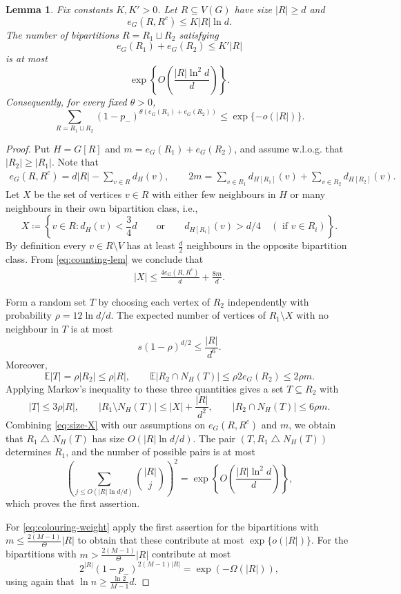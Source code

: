 \documentclass[10pt,a4paper]{amsart}
\newtheorem{lemma}[thm]{Lemma}
\begin{document}
\begin{lemma}
\label{lem:two-colour-count}
Fix constants $K, K'>0$.
Let $R\subseteq V(G)$ have size $|R|\ge d$ and
\[
 e_G(R,R^c)\le K |R|\ln d.
\]
The number of bipartitions $R=R_1\sqcup R_2$ satisfying
\[
 e_G(R_1)+e_G(R_2)\le K' |R|
\]
is at most
\[
 \exp\left\{O\left(\frac{|R|\ln^2 d}{d}\right)\right\}.
\]
Consequently, for every fixed $\theta>0$,
\begin{equation}\label{eq:colouring-weight}
 \sum_{R=R_1\sqcup R_2} (1-p_-)^{\theta(e_G(R_1)+e_G(R_2))}
 \le\exp\{-o(|R|)\}.
\end{equation}
\end{lemma}

\begin{proof}
Put $H=G[R]$ and $m=e_G(R_1)+e_G(R_2)$, and assume w.l.o.g. that $|R_2|\ge|R_1|$.
Note that
\begin{align} \label{eq:counting-lem}
   e_G(R, R^c)=d|R|- \sum_{v \in R} d_H(v), \qquad 2m= \sum_{v \in R_1} d_{H[R_1]} (v) + \sum_{v \in R_2} d_{H[R_2]}(v). 
\end{align}
Let $X$ be the set of vertices $v \in R$ with either few neighbours in $H$ or many neighbours in their own bipartition class, i.e.,
\[
 X\coloneqq \left\{v \in R: d_H(v)<\frac{3}{4}d \qquad\text{or}\qquad  d_{H[R_i]}(v)>d/4\quad( \text{ if } v\in R_i)\right\}.
\]
By definition every $v \in R\setminus V$ has at least $\frac{d}{2}$ neighbours in the opposite bipartition class.
From \eqref{eq:counting-lem} we conclude that
\begin{align} \label{eq:size-X}
    |X| \leq \frac{4 e_G(R, R^c)}{d} + \frac{8m}{d}.
\end{align}

Form a random set $T$ by choosing each vertex of $R_2$ independently with probability $\rho=12\ln d/d$. The expected number of vertices of $R_1\setminus X$ with no neighbour in $T$ is at most
\[
 s(1-\rho)^{d/2}\le \frac{|R|}{d^6}.
\]
Moreover,
\[
 \mathbb{E}|T|= \rho |R_2| \le\rho |R|,
 \qquad
 \mathbb{E}|R_2\cap N_H(T)|\le\rho 2 e_G(R_2)\le2\rho m.
\]
Applying Markov's inequality to these three quantities gives a set $T\subseteq R_2$ with
\[
 |T|\le3\rho |R|,
 \qquad
 |R_1\setminus N_H(T)|\le |X| + \frac{|R|}{d^2},
 \qquad
 |R_2\cap N_H(T)|\le6\rho m.
\]
Combining \eqref{eq:size-X} with our assumptions on $e_G(R, R^c)$ and $m$, we obtain that $R_1\mathbin{\triangle}N_H(T)$ has size $O(|R|\ln d/d)$.
The pair $(T, R_1\mathbin{\triangle}N_H(T))$ determines $R_1$, and the number of possible pairs is at most
\[
 \left(\sum_{j \le O(|R|\ln d/d)}\binom{|R|}{j}\right)^2
 =\exp\left\{O\left(\frac{|R|\ln^2 d}{d}\right)\right\},
\]
which proves the first assertion.

For \eqref{eq:colouring-weight} apply the first assertion for the bipartitions with $m\le \frac{2(M-1)}{\Theta} |R|$ to obtain that these contribute at most $\exp\{o(|R |)\}$. For the bipartitions with $m>\frac{2(M-1)}{ \Theta} |R|$ contribute at most
\[
 2^{|R|} (1-p_-)^{2 (M-1) |R|}=\exp\left(- \Omega(|R|) \right),
\]
using again that $\ln n \geq \frac{\ln 2}{M-1} d$.
\end{proof}



\end{document}

